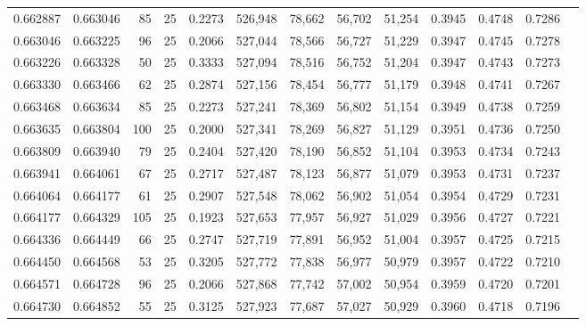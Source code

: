 \begin{tabular}{rrrrrrrrrrrrr}
0.662887 & 0.663046 &    85 &  25 &                                     0.2273 & 526,948 &  78,662 &  56,702 &  51,254 & 0.3945 & 0.4748 & 0.7286 \\
0.663046 & 0.663225 &    96 &  25 &                                     0.2066 & 527,044 &  78,566 &  56,727 &  51,229 & 0.3947 & 0.4745 & 0.7278 \\
0.663226 & 0.663328 &    50 &  25 &                                     0.3333 & 527,094 &  78,516 &  56,752 &  51,204 & 0.3947 & 0.4743 & 0.7273 \\
0.663330 & 0.663466 &    62 &  25 &                                     0.2874 & 527,156 &  78,454 &  56,777 &  51,179 & 0.3948 & 0.4741 & 0.7267 \\
0.663468 & 0.663634 &    85 &  25 &                                     0.2273 & 527,241 &  78,369 &  56,802 &  51,154 & 0.3949 & 0.4738 & 0.7259 \\
0.663635 & 0.663804 &   100 &  25 &                                     0.2000 & 527,341 &  78,269 &  56,827 &  51,129 & 0.3951 & 0.4736 & 0.7250 \\
0.663809 & 0.663940 &    79 &  25 &                                     0.2404 & 527,420 &  78,190 &  56,852 &  51,104 & 0.3953 & 0.4734 & 0.7243 \\
0.663941 & 0.664061 &    67 &  25 &                                     0.2717 & 527,487 &  78,123 &  56,877 &  51,079 & 0.3953 & 0.4731 & 0.7237 \\
0.664064 & 0.664177 &    61 &  25 &                                     0.2907 & 527,548 &  78,062 &  56,902 &  51,054 & 0.3954 & 0.4729 & 0.7231 \\
0.664177 & 0.664329 &   105 &  25 &                                     0.1923 & 527,653 &  77,957 &  56,927 &  51,029 & 0.3956 & 0.4727 & 0.7221 \\
0.664336 & 0.664449 &    66 &  25 &                                     0.2747 & 527,719 &  77,891 &  56,952 &  51,004 & 0.3957 & 0.4725 & 0.7215 \\
0.664450 & 0.664568 &    53 &  25 &                                     0.3205 & 527,772 &  77,838 &  56,977 &  50,979 & 0.3957 & 0.4722 & 0.7210 \\
0.664571 & 0.664728 &    96 &  25 &                                     0.2066 & 527,868 &  77,742 &  57,002 &  50,954 & 0.3959 & 0.4720 & 0.7201 \\
0.664730 & 0.664852 &    55 &  25 &                                     0.3125 & 527,923 &  77,687 &  57,027 &  50,929 & 0.3960 & 0.4718 & 0.7196 \\

\end{tabular}
